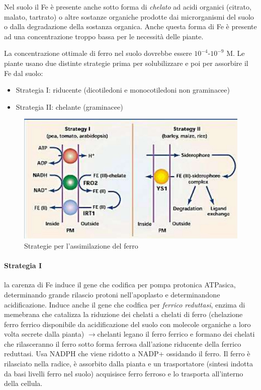 \documentclass[a4paper,12pt]{book}
\newcommand{\lfreccia}{\ensuremath{\longrightarrow}}
\begin{document}
Nel suolo il Fe è presente anche sotto forma di \emph{chelato} ad acidi organici (citrato,
malato, tartrato) o altre sostanze organiche prodotte dai microrganismi del suolo
o dalla degradazione della sostanza organica. Anche questa forma di Fe è presente ad una concentrazione troppo bassa per le necessità delle piante.

La concentrazione ottimale di ferro nel suolo dovrebbe essere $10^{-4}$-$10^{-9}$ M. Le piante usano due distinte strategie prima per solubilizzare e poi per assorbire il Fe dal suolo:
\begin{itemize}
\item{Strategia I: riducente (dicotiledoni e monocotiledoni non graminacee)}
\item{Strategia II: chelante (graminacee)}
\end{itemize}

\begin{figure}[H]
\centering
\includegraphics[scale=0.4]{immagini/strategie.jpg}
\caption{Strategie per l'assimilazione del ferro}
\end{figure}

\paragraph{Strategia I} 
la carenza di Fe induce il gene che codifica per pompa protonica ATPasica, determinando grande rilascio protoni nell'apoplasto e determinandone acidificazione. 
Induce anche il gene che codfica per \emph{ferrico reduttasi}, enzima di memebrana che catalizza la riduzione dei chelati a chelati di ferro (chelazione ferro ferrico disponibile da acidificazione del suolo con molecole organiche a loro volta secrete dalla pianta) \lfreccia chelanti legano il ferro ferrico e formano dei chelati che rilasceranno il ferro sotto forma ferrosa dall'azione riducente della ferrico reduttasi. Usa NADPH che viene ridotto a NADP+ ossidando il ferro. Il ferro è rilasciato nella radice, è assorbito dalla pianta e un trasportatore (sintesi indotta da basi livelli ferro nel suolo) acquisisce ferro ferroso e lo trasporta all'interno della cellula. 
\end{document}
